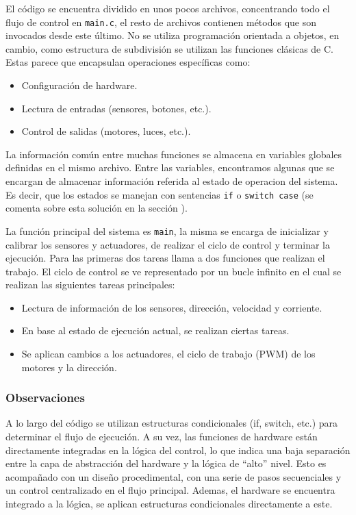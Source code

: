 El código se encuentra dividido en unos pocos archivos, concentrando todo el flujo de control en \verb|main.c|, el resto de archivos contienen métodos que son invocados desde este último. No se utiliza programación orientada a objetos, en cambio, como estructura de subdivisión se utilizan las funciones clásicas de C. Estas parece que encapsulan operaciones específicas como:
\begin{itemize}
\item Configuración de hardware.
\item Lectura de entradas (sensores, botones, etc.).
\item Control de salidas (motores, luces, etc.).
\end{itemize}

La información común entre muchas funciones se almacena en variables globales definidas en el mismo archivo. Entre las variables, encontramos algunas que se encargan de almacenar información referida al estado de operacion del sistema. Es decir, que los estados se manejan con sentencias \verb|if| o \verb|switch case| (se comenta sobre esta solución en la sección ).

La función principal del sistema es \verb|main|, la misma se encarga de inicializar y calibrar los sensores y actuadores, de realizar el ciclo de control y terminar la ejecución. Para las primeras dos tareas llama a dos funciones que realizan el trabajo. El ciclo de control se ve representado por un bucle infinito en el cual se realizan las siguientes tareas principales:
\begin{itemize}
\item Lectura de información de los sensores, dirección, velocidad y corriente.
\item En base al estado de ejecución actual, se realizan ciertas tareas.
\item Se aplican cambios a los actuadores, el ciclo de trabajo (\gls{PWM}) de los motores y la dirección.
\end{itemize}

\subsubsection*{Observaciones}
A lo largo del código se utilizan estructuras condicionales (if, switch, etc.) para determinar el flujo de ejecución. A su vez, las funciones de hardware están directamente integradas en la lógica del control, lo que indica una baja separación entre la capa de abstracción del hardware y la lógica de ``alto'' nivel. Esto es acompañado con un diseño procedimental, con una serie de pasos secuenciales y un control centralizado en el flujo principal. Ademas, el hardware se encuentra integrado a la lógica, se aplican estructuras condicionales directamente a este.

